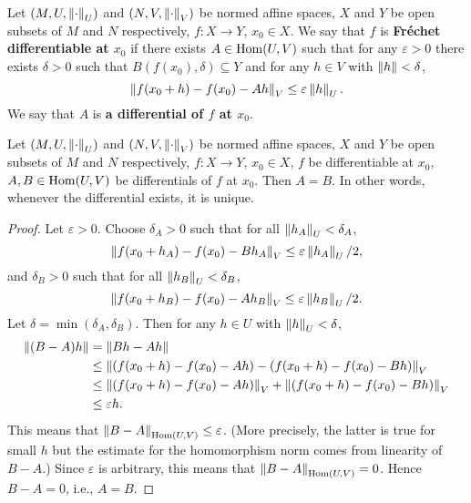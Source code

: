 \begin{definition}
  Let
    $(M, U, \left\lVert\cdot\right\rVert_U)$ and $(N, V, \left\lVert\cdot\right\rVert_V)$
      be normed affine spaces,
    $X$ and $Y$ be open subsets of $M$ and $N$ respectively,
    $f \colon X \to Y$,
    $x_0 \in X$.
  We say that $f$ is \textbf{Fr\'{e}chet differentiable at $x_0$} if
  there exists $A \in \mathop{\rm Hom}\nolimits(U, V)$ such that
  for any $\varepsilon > 0$
  there exists $\delta > 0$ such that
  $B(f(x_0), \delta) \subseteq Y$ and
  for any $h \in V$ with $\left\lVert h\right\rVert < \delta$,
  \begin{equation}
    \left\lVert f(x_0 + h) - f(x_0) - A h\right\rVert_V \leq \varepsilon \left\lVert h\right\rVert_U.
  \end{equation}
  We say that $A$ is \textbf{a differential of $f$ at $x_0$}.
\end{definition}
\begin{proposition}
  Let
    $(M, U, \left\lVert\cdot\right\rVert_U)$ and $(N, V, \left\lVert\cdot\right\rVert_V)$
      be normed affine spaces,
    $X$ and $Y$ be open subsets of $M$ and $N$ respectively,
    $f \colon X \to Y$,
    $x_0 \in X$,
    $f$ be differentiable at $x_0$,
    $A, B \in \mathop{\rm Hom}\nolimits(U, V)$ be differentials of $f$ at $x_0$.
  Then $A = B$.
  In other words, whenever the differential exists, it is unique.
\end{proposition}
\begin{proof}
  Let $\varepsilon > 0$.
  Choose $\delta_A > 0$ such that for all $\left\lVert h_A\right\rVert_U < \delta_A$,
  \begin{equation}
    \left\lVert f(x_0 + h_A) - f(x_0) - B h_A\right\rVert_V \leq \varepsilon \left\lVert h_A\right\rVert_U / 2,
  \end{equation}
  and $\delta_B > 0$ such that for all $\left\lVert h_B\right\rVert_U < \delta_B$,
  \begin{equation}
    \left\lVert f(x_0 + h_B) - f(x_0) - A h_B\right\rVert_V \leq \varepsilon \left\lVert h_B\right\rVert_U / 2.
  \end{equation}
  Let $\delta = \min(\delta_A, \delta_B)$.
  Then for any $h \in U$ with $\left\lVert h\right\rVert_U < \delta$,
  \begin{equation}
    \begin{split}
      \left\lVert(B - A) h\right\rVert
      & = \left\lVert B h - A h\right\rVert \\
      & \leq
        \left\lVert(f(x_0 + h) - f(x_0) - A h) - (f(x_0 + h) - f(x_0) - B h)\right\rVert_V \\
      & \leq \left\lVert(f(x_0 + h) - f(x_0) - A h)\right\rVert_V
        + \left\lVert(f(x_0 + h) - f(x_0) - B h)\right\rVert_V \\
      & \leq \varepsilon h.
    \end{split}
  \end{equation}
  This means that $\left\lVert B - A\right\rVert_{\mathop{\rm Hom}\nolimits(U, V)} \leq \varepsilon$.
  (More precisely, the latter is true for small $h$ but the estimate for the
  homomorphism norm comes from linearity of $B - A$.)
  Since $\varepsilon$ is arbitrary, this means that
  $\left\lVert B - A\right\rVert_{\mathop{\rm Hom}\nolimits(U, V)} = 0$.
  Hence $B - A = 0$, i.e., $A = B$.
\end{proof}
